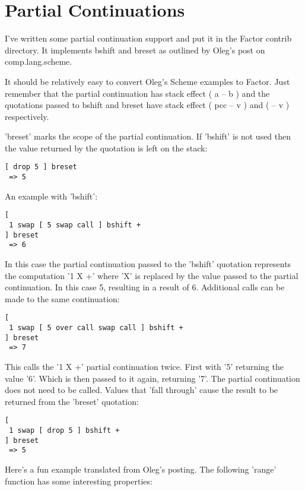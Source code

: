 \chapter{Partial Continuations}\label{partialcontinuations}

I've written some partial continuation support and put it in the
Factor contrib directory. It implements bshift and breset as outlined
by Oleg's post on comp.lang.scheme.


It should be relatively easy to convert Oleg's Scheme examples to
Factor. Just remember that the partial continuation has stack effect (
a -- b ) and the quotations passed to bshift and breset have stack
effect ( pcc -- v ) and ( -- v ) respectively.

'breset' marks the scope of the partial continuation. If 'bshift' is
not used then the value returned by the quotation is left on the
stack:

\begin{verbatim}
[ drop 5 ] breset
 => 5
\end{verbatim}


An example with 'bshift':

\begin{verbatim}
[
 1 swap [ 5 swap call ] bshift +
] breset
 => 6
\end{verbatim}


In this case the partial continuation passed to the 'bshift' quotation
represents the computation '1 X +' where 'X' is replaced by the value
passed to the partial continuation. In this case 5, resulting in a
result of 6. Additional calls can be made to the same continuation:

\begin{verbatim}
[
 1 swap [ 5 over call swap call ] bshift +
] breset
 => 7
\end{verbatim}


This calls the '1 X +' partial continuation twice. First with '5'
returning the value '6'. Which is then passed to it again, returning
'7'. The partial continuation does not need to be called. Values that
'fall through' cause the result to be returned from the 'breset'
quotation:

\begin{verbatim}
[
 1 swap [ drop 5 ] bshift +
] breset
 => 5
\end{verbatim}


Here's a fun example translated from Oleg's posting. The following
'range' function has some interesting properties:

